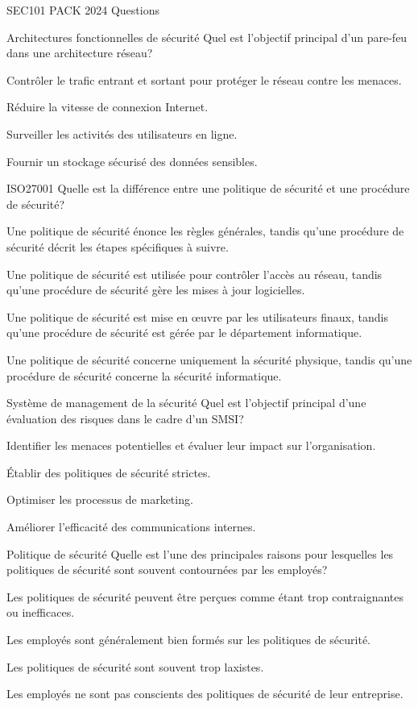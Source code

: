 \documentclass[12pt]{article}
\begin{document}
\begin{quiz}{SEC101 PACK 2024 Questions}
\begin{multi}[points=1]{Architectures fonctionnelles de sécurité}
Quel est l'objectif principal d'un pare-feu dans une architecture réseau?
\item* Contrôler le trafic entrant et sortant pour protéger le réseau contre les menaces.
\item Réduire la vitesse de connexion Internet.
\item Surveiller les activités des utilisateurs en ligne.
\item Fournir un stockage sécurisé des données sensibles.
\end{multi}

\begin{multi}[points=1]{ISO27001}
Quelle est la différence entre une politique de sécurité et une procédure de sécurité?
\item* Une politique de sécurité énonce les règles générales, tandis qu'une procédure de sécurité décrit les étapes spécifiques à suivre.
\item Une politique de sécurité est utilisée pour contrôler l'accès au réseau, tandis qu'une procédure de sécurité gère les mises à jour logicielles.
\item Une politique de sécurité est mise en œuvre par les utilisateurs finaux, tandis qu'une procédure de sécurité est gérée par le département informatique.
\item Une politique de sécurité concerne uniquement la sécurité physique, tandis qu'une procédure de sécurité concerne la sécurité informatique.
\end{multi}

\begin{multi}[points=1]{Système de management de la sécurité}
Quel est l'objectif principal d'une évaluation des risques dans le cadre d'un SMSI?
\item* Identifier les menaces potentielles et évaluer leur impact sur l'organisation.
\item Établir des politiques de sécurité strictes.
\item Optimiser les processus de marketing.
\item Améliorer l'efficacité des communications internes.
\end{multi}

\begin{multi}[points=1]{Politique de sécurité}
Quelle est l'une des principales raisons pour lesquelles les politiques de sécurité sont souvent contournées par les employés?
\item* Les politiques de sécurité peuvent être perçues comme étant trop contraignantes ou inefficaces.
\item Les employés sont généralement bien formés sur les politiques de sécurité.
\item Les politiques de sécurité sont souvent trop laxistes.
\item Les employés ne sont pas conscients des politiques de sécurité de leur entreprise.
\end{multi}


\end{quiz}
\end{document}
